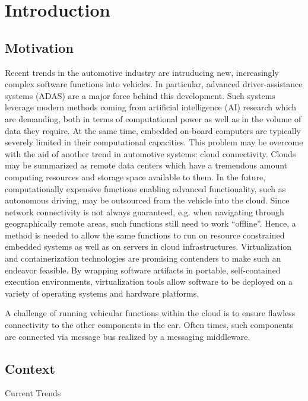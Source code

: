 
\section{Introduction} 
\label{introduction}

\subsection{Motivation}
Recent trends in the automotive industry are intruducing new, increasingly complex software functions into vehicles. In particular, advanced driver-assistance systems (ADAS) are a major force behind this development. Such systems leverage modern methods coming from artificial intelligence (AI) research which are demanding, both in terms of computational power as well as in the volume of data they require. At the same time, embedded on-board computers are typically severely limited in their computational capacities. This problem may be overcome with the aid of another trend in automotive systems: cloud connectivity. Clouds may be summarized as remote data centers which have a tremendous amount computing resources and storage space available to them. In the future, computationally expensive functions enabling advanced functionality, such as autonomous driving, may be outsourced from the vehicle into the cloud. Since network connectivity is not always guaranteed, e.g. when navigating through geographically remote areas, such functions still need to work ``offline''. Hence, a method is needed to allow the same functions to run on resource constrained embedded systems as well as on servers in cloud infrastructures. Virtualization and containerization technologies are promising contenders to make such an endeavor feasible. By wrapping software artifacts in portable, self-contained execution environments, virtualization tools allow software to be deployed on a variety of operating systems and hardware platforms.

A challenge of running vehicular functions within the cloud is to ensure flawless connectivity to the other components in the car. Often times, such components are connected via message bus realized by a messaging middleware.

%
%
%
%
%
%
%
%
%
%

\subsection{Context}
Current Trends


%
%
%
%
%
%
%
%
%
%

